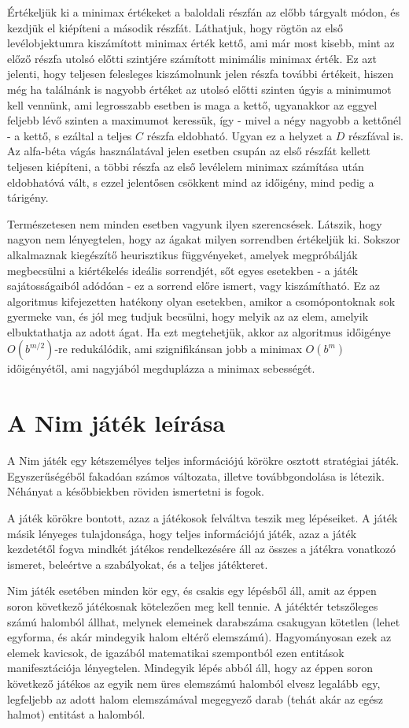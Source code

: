 Értékeljük ki a minimax értékeket a baloldali részfán az előbb tárgyalt módon, és kezdjük el kiépíteni a második részfát. Láthatjuk, hogy rögtön az első levélobjektumra kiszámított minimax érték kettő, ami már most kisebb, mint az előző részfa utolsó előtti szintjére számított minimális minimax érték. Ez azt jelenti, hogy teljesen felesleges kiszámolnunk jelen részfa további értékeit, hiszen még ha találnánk is nagyobb értéket az utolsó előtti szinten úgyis a minimumot kell vennünk, ami legrosszabb esetben is maga a kettő, ugyanakkor az eggyel feljebb lévő szinten a maximumot keressük, így - mivel a négy nagyobb a kettőnél - a kettő, s ezáltal a teljes $C$ részfa eldobható. Ugyan ez a helyzet a $D$ részfával is. Az alfa-béta vágás használatával jelen esetben csupán az első részfát kellett teljesen kiépíteni, a többi részfa az első levélelem minimax számítása után eldobhatóvá vált, s ezzel jelentősen csökkent mind az időigény, mind pedig a tárigény.\ujsor

Természetesen nem minden esetben vagyunk ilyen szerencsések. Látszik, hogy nagyon nem lényegtelen, hogy az ágakat milyen sorrendben értékeljük ki. Sokszor alkalmaznak kiegészítő heurisztikus függvényeket, amelyek megpróbálják megbecsülni a kiértékelés ideális sorrendjét, sőt egyes esetekben - a játék sajátosságaiból adódóan - ez a sorrend előre ismert, vagy kiszámítható. Ez az algoritmus kifejezetten hatékony olyan esetekben, amikor a csomópontoknak sok gyermeke van, és jól meg tudjuk becsülni, hogy melyik az az elem, amelyik elbuktathatja az adott ágat. Ha ezt megtehetjük, akkor az algoritmus időigénye $O(b^{m/2})$-re redukálódik, ami szignifikánsan jobb a minimax $O(b^m)$ időigényétől, ami nagyjából megduplázza a minimax sebességét.

\section{A Nim játék leírása}
A Nim játék egy kétszemélyes teljes információjú körökre osztott stratégiai játék. Egyszerűségéből fakadóan számos változata, illetve továbbgondolása is létezik. Néhányat a későbbiekben röviden ismertetni is fogok. \ujsor

A játék körökre bontott, azaz a játékosok felváltva teszik meg lépéseiket. A játék másik lényeges tulajdonsága, hogy teljes információjú játék, azaz a játék kezdetétől fogva mindkét játékos rendelkezésére áll az összes a játékra vonatkozó ismeret, beleértve a szabályokat, és a teljes játékteret.\ujsor

Nim játék esetében minden kör egy, és csakis egy lépésből áll, amit az éppen soron következő játékosnak kötelezően meg kell tennie. A játéktér tetszőleges számú halomból állhat, melynek elemeinek darabszáma csakugyan kötetlen (lehet egyforma, és akár mindegyik halom eltérő elemszámú). Hagyományosan ezek az elemek kavicsok, de igazából matematikai szempontból ezen entitások manifesztációja lényegtelen. Mindegyik lépés abból áll, hogy az éppen soron következő játékos az egyik nem üres elemszámú halomból elvesz legalább egy, legfeljebb az adott halom elemszámával megegyező darab (tehát akár az egész halmot) entitást a halomból.\ujsor

